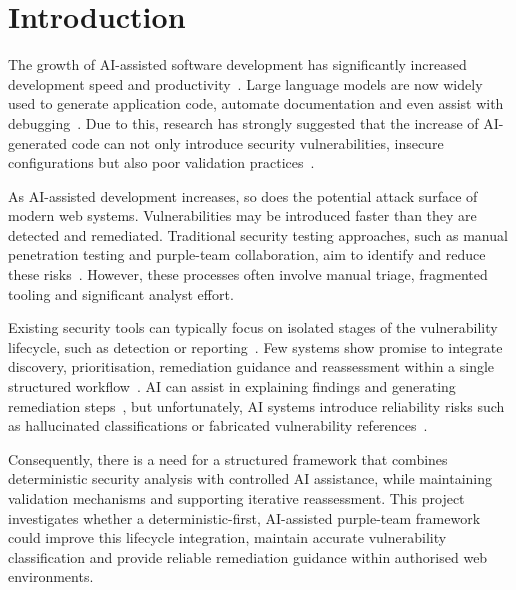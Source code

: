 \documentclass[12pt, a4paper, oneside]{report}
\begin{document}
\tableofcontents
\listoffigures
\listoftables

\cleardoublepage
{}
\setcounter{page}{1}

\chapter{Introduction}

The growth of AI-assisted software development has significantly
increased development speed and productivity~\cite{sarkar2025}. Large
language models are now widely used to generate application code,
automate documentation and even assist with debugging~\cite{sarkar2025}.
Due to this, research has strongly suggested that the increase of
AI-generated code can not only introduce security vulnerabilities,
insecure configurations but also poor validation practices~\cite{singh2024}.

As AI-assisted development increases, so does the potential attack
surface of modern web systems. Vulnerabilities may be introduced faster
than they are detected and remediated. Traditional security testing
approaches, such as manual penetration testing and purple-team
collaboration, aim to identify and reduce these risks~\cite{oakley2019}.
However, these processes often involve manual triage, fragmented tooling
and significant analyst effort.

Existing security tools can typically focus on isolated stages of the
vulnerability lifecycle, such as detection or reporting~\cite{chalvatzis2019}.
Few systems show promise to integrate discovery, prioritisation,
remediation guidance and reassessment within a single structured
workflow~\cite{vandeleur2026}. AI can assist in explaining findings and
generating remediation steps~\cite{ijrah2026,khandagale2025}, but
unfortunately, AI systems introduce reliability risks such as
hallucinated classifications or fabricated vulnerability
references~\cite{farquhar2024}.

Consequently, there is a need for a structured framework that combines
deterministic security analysis with controlled AI assistance, while
maintaining validation mechanisms and supporting iterative reassessment. This project investigates whether a deterministic-first, AI-assisted
purple-team framework could improve this lifecycle integration, maintain
accurate vulnerability classification and provide reliable remediation
guidance within authorised web environments.
\end{document}

